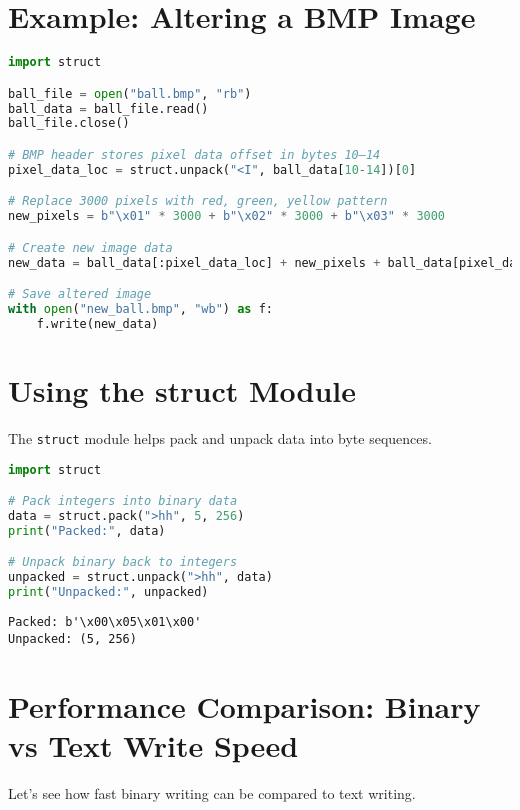 \section*{Example: Altering a BMP Image}
\begin{lstlisting}[language=Python, caption={Modifying pixels in a BMP image.}]
import struct

ball_file = open("ball.bmp", "rb")
ball_data = ball_file.read()
ball_file.close()

# BMP header stores pixel data offset in bytes 10–14
pixel_data_loc = struct.unpack("<I", ball_data[10-14])[0]

# Replace 3000 pixels with red, green, yellow pattern
new_pixels = b"\x01" * 3000 + b"\x02" * 3000 + b"\x03" * 3000

# Create new image data
new_data = ball_data[:pixel_data_loc] + new_pixels + ball_data[pixel_data_loc + len(new_pixels):]

# Save altered image
with open("new_ball.bmp", "wb") as f:
    f.write(new_data)
\end{lstlisting}

\section*{Using the struct Module}
The \texttt{struct} module helps pack and unpack data into byte sequences.

\begin{lstlisting}[language=Python, caption={Packing and unpacking bytes.}]
import struct

# Pack integers into binary data
data = struct.pack(">hh", 5, 256)
print("Packed:", data)

# Unpack binary back to integers
unpacked = struct.unpack(">hh", data)
print("Unpacked:", unpacked)
\end{lstlisting}

\begin{verbatim}
Packed: b'\x00\x05\x01\x00'
Unpacked: (5, 256)
\end{verbatim}

\section*{Performance Comparison: Binary vs Text Write Speed}
Let’s see how fast binary writing can be compared to text writing.

